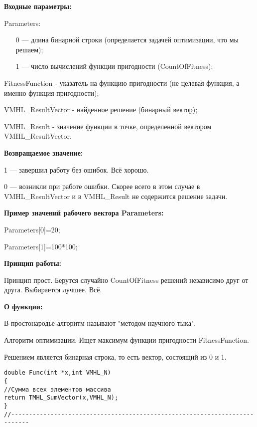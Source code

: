 \textbf{Входные параметры:}

 Parameters:
 
 \begin{itemize}
 \item [0] --- длина бинарной строки (определается задачей оптимизации, что мы решаем);
 \item [1] --- число вычислений функции пригодности (CountOfFitness);
 \end{itemize}
  
 FitnessFunction - указатель на функцию пригодности (не целевая функция, а именно функция пригодности);
 
 VMHL\_ResultVector - найденное решение (бинарный вектор);
 
 VMHL\_Result - значение функции в точке, определенной вектором VMHL\_ResultVector.

\textbf{Возвращаемое значение:}
 
 1 --- завершил работу без ошибок. Всё хорошо.
 
 0 --- возникли при работе ошибки. Скорее всего в этом случае в VMHL\_ResultVector и в VMHL\_Result не содержится решение задачи.
 
\textbf{Пример значений рабочего вектора Parameters:}

 Parameters[0]=20;
 
 Parameters[1]=100*100;
 
 \textbf{Принцип работы:}
 
 Принцип прост. Берутся случайно CountOfFitness решений независимо друг от друга. Выбирается лучшее. Всё.
 
 \textbf{ О функции:}
 
 В простонародье алгоритм называют "методом научного тыка".
 
Алгоритм оптимизации. Ищет максимум функции пригодности FitnessFunction.

Решением является бинарная строка, то есть вектор, состоящий из 0 и 1.

\begin{lstlisting}[caption=Оптимизируемая функция]
double Func(int *x,int VMHL_N)
{
//Сумма всех элементов массива
return TMHL_SumVector(x,VMHL_N);
}
//---------------------------------------------------------------------------
\end{lstlisting}